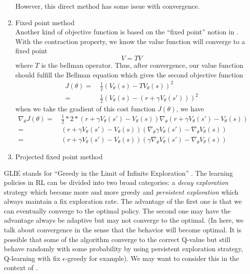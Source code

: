 \documentclass[9pt]{article}
\begin{document}
\begin{enumerate}
However, this direct method has some issue with convergence. 
\item Fixed point method\\
Another kind of objective function is based on the ``fixed point'' notion in . With the contraction property, we know the value function will converge to a fixed point
\[
	V = TV
\]
where $T$ is the bellman operator. Thus, after convergence, our value function should fulfill the Bellman equation which gives the second objective function
\[
\begin{split}
J(\theta) = &\ \frac{1}{2}(V_{\theta}(s) - TV_{\theta}(s))^2\\
= &\ \frac{1}{2}(V_{\theta}(s)-(r+\gamma V_{\theta}(s')))^2
\end{split}
\]
when we take the gradient of this cost function $J(\theta)$, we have
\[
\begin{split}
\nabla_{\theta} J(\theta) = &\ \frac{1}{2} * 2 * (r+\gamma V_{\theta}(s') - V_{\theta}(s)) \nabla_{\theta} (r+\gamma V_{\theta}(s') - V_{\theta}(s))\\
= &\ (r+\gamma V_{\theta}(s') - V_{\theta}(s)) (\nabla_{\theta} \gamma V_{\theta}(s') - \nabla_{\theta}  V_{\theta}(s))\\
= &\ (r+\gamma V_{\theta}(s') - V_{\theta}(s)) (\gamma \nabla_{\theta} V_{\theta}(s') - \nabla_{\theta}  V_{\theta}(s))
\end{split}
\]

\item Projected fixed point method 
\end{enumerate}

GLIE stands for ``Greedy in the Limit of Infinite Exploration'' \citep{singh2000convergence}. The learning policies in RL can be divided into two broad categories: a \textit{decay exploration} strategy which become more and more greedy and \textit{persistent exploration} which always maintain a fix exploration rate. The advantage of the first one is that we can eventually converge to the optimal policy. The second one may have the advantage always be adaptive but may not converge to the optimal. (In here, we talk about convergence in the sense that the behavior will become optimal. It is possible that some of the algorithm converge to the correct Q-value but still behave randomly with some probability by using persistent exploration strategy, Q-learning with fix $\epsilon$-greedy for example). We may want to consider this in the context of .
\end{document}
